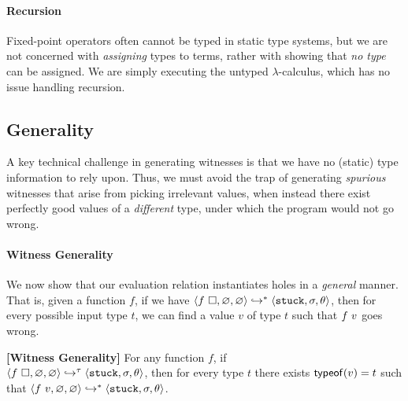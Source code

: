\paragraph{Recursion}
Fixed-point operators often cannot be typed in static type systems, but
we are not concerned with \emph{assigning} types to terms, rather with
showing that \emph{no type} can be assigned. We are simply executing the
untyped $\lambda$-calculus, which has no issue handling recursion.


%
\subsection{Generality}\label{sec:soundness}

A key technical challenge in generating witnesses is
that we have no (static) type information to rely upon. Thus, we
must avoid the trap of generating \emph{spurious} witnesses that
arise from picking irrelevant values, when instead there exist
perfectly good values of a \emph{different} type, under which
the program would not go wrong.

\paragraph{Witness Generality}
We now show that our evaluation relation instantiates holes in a
\emph{general} manner. That is, given a function $f$, if we have
$\langle f\ \square{}, \varnothing, \varnothing \rangle \hookrightarrow^{*} \langle \mathtt{stuck}, \sigma, \theta \rangle$,
then for every possible input type $t$, we can find a value
$v$ of type $t$ such that $f\ v$ goes wrong.

\begin{thm}{\textbf{[Witness Generality]}}
\label{thm:soundness}
  For any function $f$, if\\
  \hbox{$\langle f\ \square, \varnothing, \varnothing \rangle \hookrightarrow^{\tau} \langle \mathtt{stuck}, \sigma, \theta \rangle$,}
  then for every %
  type
  $t$ there exists $\mathsf{typeof}(v) = {t}$ such that
  $\langle f\ v, \varnothing, \varnothing \rangle \hookrightarrow^{*} \langle \mathtt{stuck}, \sigma, \theta \rangle$.
\end{thm}


